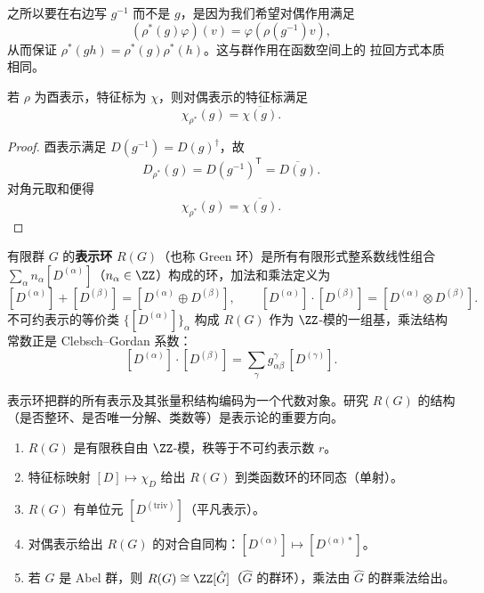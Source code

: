 之所以要在右边写 $g^{-1}$ 而不是 $g$，是因为我们希望对偶作用满足
\[
(\rho^*(g)\varphi)(v)=\varphi(\rho(g^{-1})v),
\]
从而保证 $\rho^*(gh)=\rho^*(g)\rho^*(h)$。这与群作用在函数空间上的 拉回方式本质相同。

\begin{proposition}[酉表示的对偶特征标]
若 $\rho$ 为酉表示，特征标为 $\chi$，则对偶表示的特征标满足
\[
\chi_{\rho^*}(g)=\overline{\chi(g)}.
\]
\label{prop:character-dual}

\end{proposition}

\begin{proof}
酉表示满足 $D(g^{-1})=D(g)^\dagger$，故
\[
D_{\rho^*}(g)=D(g^{-1})^{\mathsf T}=\overline{D(g)}.
\]
对角元取和便得
\[
\chi_{\rho^*}(g)=\overline{\chi(g)}.
\]
\end{proof}


\begin{definition}
有限群 $G$ 的\textbf{表示环} $R(G)$（也称 Green 环）是所有有限形式整系数线性组合 $\sum_\alpha n_\alpha[D^{(\alpha)}]$（$n_\alpha\in\ZZ$）构成的环，加法和乘法定义为
\[
[D^{(\alpha)}]+[D^{(\beta)}]=[D^{(\alpha)}\oplus D^{(\beta)}],\qquad
[D^{(\alpha)}]\cdot[D^{(\beta)}]=[D^{(\alpha)}\otimes D^{(\beta)}].
\]
不可约表示的等价类 $\{[D^{(\alpha)}]\}_\alpha$ 构成 $R(G)$ 作为 $\ZZ$-模的一组基，乘法结构常数正是 Clebsch--Gordan 系数：
\[
[D^{(\alpha)}]\cdot[D^{(\beta)}]=\sum_\gamma g_{\alpha\beta}^\gamma\,[D^{(\gamma)}].
\]
\end{definition}

表示环把群的所有表示及其张量积结构编码为一个代数对象。研究 $R(G)$ 的结构（是否整环、是否唯一分解、类数等）是表示论的重要方向。

\begin{proposition}[表示环的基本性质]
\label{prop:rep-ring-properties}
\begin{enumerate}[label=(\roman*),leftmargin=3em]
\item $R(G)$ 是有限秩自由 $\ZZ$-模，秩等于不可约表示数 $r$。
\item 特征标映射 $[D]\mapsto\chi_D$ 给出 $R(G)$ 到类函数环的环同态（单射）。
\item $R(G)$ 有单位元 $[D^{(\mathrm{triv})}]$（平凡表示）。
\item 对偶表示给出 $R(G)$ 的对合自同构：$[D^{(\alpha)}]\mapsto[D^{(\alpha)*}]$。
\item 若 $G$ 是 Abel 群，则 $R(G)\cong\ZZ[\hat G]$（$\hat G$ 的群环），乘法由 $\hat G$ 的群乘法给出。
\end{enumerate}
\end{proposition}

